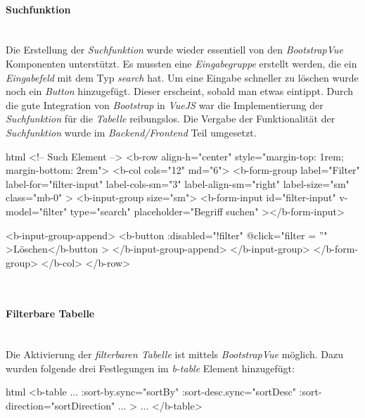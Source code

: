 \paragraph{Suchfunktion}
~\\
Die Erstellung der \textit{Suchfunktion} wurde wieder essentiell von den \textit{BootstrapVue} Komponenten unterstützt. Es mussten eine \textit{Eingabegruppe} erstellt werden, die ein \textit{Eingabefeld} mit dem Typ \textit{search} hat. Um eine Eingabe schneller zu löschen wurde noch ein \textit{Button} hinzugefügt. Dieser erscheint, sobald man etwas eintippt. Durch die gute Integration von \textit{Bootstrap} in \textit{VueJS} war die Implementierung der \textit{Suchfunktion} für die \textit{Tabelle} reibungslos. Die Vergabe der Funktionalität der \textit{Suchfunktion} wurde im \textit{Backend/Frontend} Teil umgesetzt.
\begin{code}{html}
	<!-- Such Element -->
    <b-row align-h="center" style="margin-top: 1rem; margin-bottom: 2rem">
      <b-col cols="12" md="6">
        <b-form-group
          label="Filter"
          label-for="filter-input"
          label-cols-sm="3"
          label-align-sm="right"
          label-size="sm"
          class="mb-0"
        >
          <b-input-group size="sm">
            <b-form-input
              id="filter-input"
              v-model="filter"
              type="search"
              placeholder="Begriff suchen"
            ></b-form-input>

            <b-input-group-append>
              <b-button :disabled="!filter" @click="filter = ''"
                >Löschen</b-button
              >
            </b-input-group-append>
          </b-input-group>
        </b-form-group>
      </b-col>
    </b-row>
\end{code}
	\label{list:antragsearchcode} ~\\
\newpage
\paragraph{Filterbare Tabelle}
~\\
Die Aktivierung der \textit{filterbaren Tabelle} ist mittels \textit{BootstrapVue} möglich. Dazu wurden folgende drei Festlegungen im \textit{b-table} Element hinzugefügt:
\begin{code}{html}
	<b-table
		...
		:sort-by.sync="sortBy"
      	:sort-desc.sync="sortDesc"
      	:sort-direction="sortDirection"
		...
	>
	...
	</b-table>
\end{code}
	\label{list:antragfiltercode} ~\\

